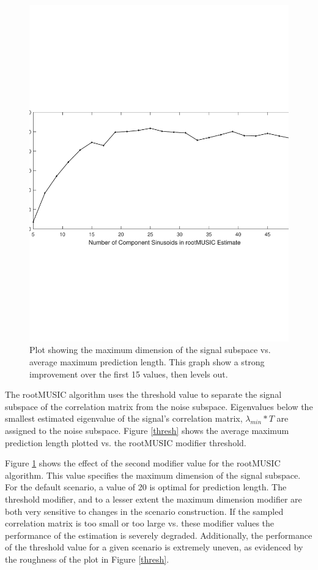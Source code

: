 \documentclass{allertonproc}
\begin{document}
\begin{figure}[ptb]
\begin{center}
\includegraphics[width=6in]{numSinusoids}
\caption{Plot showing the maximum dimension of the signal subspace vs. average maximum prediction length. This graph show a strong improvement over the first 15 values, then levels out.}\label{sinusoid}
\end{center}
\end{figure}
The rootMUSIC algorithm uses the threshold value to separate the signal subspace of the correlation matrix from the noise subspace. Eigenvalues below the smallest estimated eigenvalue of the signal's correlation matrix, $\lambda_{min} *T$ are assigned to the noise subspace\cite{matlab}. Figure \ref{thresh} shows the average maximum prediction length plotted vs. the rootMUSIC modifier threshold. %

Figure \ref{sinusoid} shows the effect of the second modifier value for the rootMUSIC algorithm. This value specifies the maximum dimension of the signal subspace. For the default scenario, a value of 20 is optimal for prediction length. The threshold modifier, and to a lesser extent the maximum dimension modifier are both very sensitive to changes in the scenario construction. If the sampled correlation matrix is too small or too large vs. these modifier values the performance of the estimation is severely degraded. Additionally, the performance of the threshold value for a given scenario is extremely uneven, as evidenced by the roughness of the plot in Figure \ref{thresh}.
\end{document}
